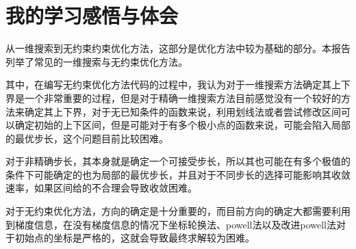 \section{我的学习感悟与体会}

从一维搜索到无约束约束优化方法，这部分是优化方法中较为基础的部分。本报告列举了常见的一维搜索与无约束优化方法。

其中，在编写无约束优化方法代码的过程中，我认为对于一维搜索方法确定其上下界是一个非常重要的过程，但是对于精确一维搜索方法目前感觉没有一个较好的方法来确定其上下界，对于无已知条件的函数来说，利用划线法或者尝试修改区间可以确定初始的上下区间，但是可能对于有多个极小点的函数来说，可能会陷入局部的最优步长，这个问题目前比较困难。

对于非精确步长，其本身就是确定一个可接受步长，所以其也可能在有多个极值的条件下可能确定的也为局部的最优步长，并且对于不同步长的选择可能影响其收敛速率，如果区间给的不合理会导致收敛困难。

对于无约束优化方法，方向的确定是十分重要的，而目前方向的确定大都需要利用到梯度信息，在没有梯度信息的情况下坐标轮换法、powell法以及改进powell法对于初始点的坐标是严格的，这就会导致最终求解较为困难。
